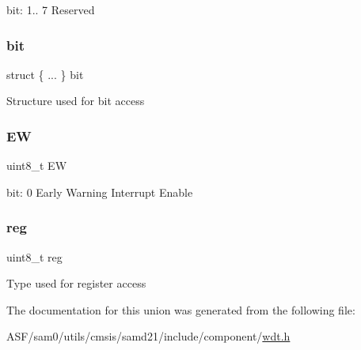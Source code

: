 bit\+: 1.. 7 Reserved \mbox{\label{union_w_d_t___i_n_t_e_n_s_e_t___type_a7a26d50182a3ddd45ef71e4c844dbfb2}} 
\subsubsection{\texorpdfstring{bit}{bit}}
{\footnotesize\ttfamily struct \{ ... \}   bit}

Structure used for bit access \mbox{\label{union_w_d_t___i_n_t_e_n_s_e_t___type_a187628158e640ab75b63af25c00d9ba7}} 
\subsubsection{\texorpdfstring{EW}{EW}}
{\footnotesize\ttfamily uint8\+\_\+t EW}

bit\+: 0 Early Warning Interrupt Enable \mbox{\label{union_w_d_t___i_n_t_e_n_s_e_t___type_a9428adc9af4653a2050e2536b55dec8d}} 
\subsubsection{\texorpdfstring{reg}{reg}}
{\footnotesize\ttfamily uint8\+\_\+t reg}

Type used for register access 

The documentation for this union was generated from the following file\+:\begin{DoxyCompactItemize}
\item 
A\+S\+F/sam0/utils/cmsis/samd21/include/component/\mbox{\hyperlink{component_2wdt_8h}{wdt.\+h}}\end{DoxyCompactItemize}
